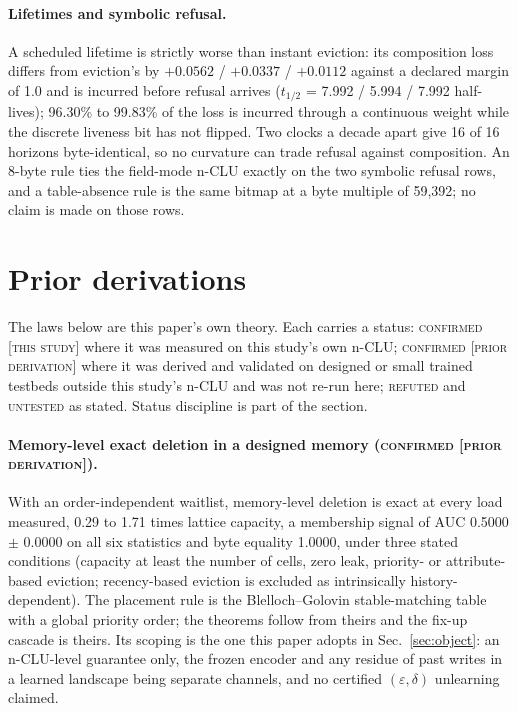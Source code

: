\documentclass{article} %
\begin{document}
\paragraph{Lifetimes and symbolic refusal.} A scheduled lifetime is strictly worse than instant
eviction: its composition loss differs from eviction's by $+0.0562$ / $+0.0337$ / $+0.0112$ against a
declared margin of 1.0 and is incurred before refusal arrives ($t_{1/2}$ = 7.992 / 5.994 / %
7.992 half-lives); 96.30\% to 99.83\% of the loss is incurred through a continuous weight while the
discrete liveness bit has not flipped. %
Two clocks a decade apart give 16 of 16 horizons byte-identical, so no curvature can trade refusal
against composition. An 8-byte rule ties the field-mode n-CLU exactly on the two symbolic refusal rows,
and a table-absence rule is the same bitmap at a byte multiple of 59,392; no claim is made on those
rows. %

\section{Prior derivations}
\label{app:shorts}

The laws below
are this paper's own theory. Each carries a status: \textsc{confirmed [this study]} where it was
measured on this study's own n-CLU; \textsc{confirmed [prior derivation]} where it was derived and
validated on designed or small trained testbeds outside this study's n-CLU and was not re-run
here; \textsc{refuted} and \textsc{untested} as stated. Status discipline is part of the section.


\paragraph{Memory-level exact deletion in a designed memory (\textsc{confirmed [prior
derivation]}).} With an order-independent waitlist, memory-level deletion is exact at every load
measured, 0.29 to 1.71 times lattice capacity, a membership signal of AUC 0.5000 $\pm$ 0.0000 on all
six statistics and byte equality 1.0000, under three stated conditions (capacity at least the number
of cells, zero leak, priority- or attribute-based eviction; recency-based eviction is excluded as
intrinsically history-dependent). %
The placement rule is the Blelloch--Golovin stable-matching table~\citep{blelloch2007strongly} with a global priority order;
the theorems follow from theirs and the fix-up cascade is theirs. Its scoping is the one this
paper adopts in Sec.~\ref{sec:object}: an n-CLU-level guarantee only, the frozen encoder and any
residue of past writes in a learned landscape being separate channels, and no certified
$(\varepsilon,\delta)$ unlearning claimed. %
\end{document}
